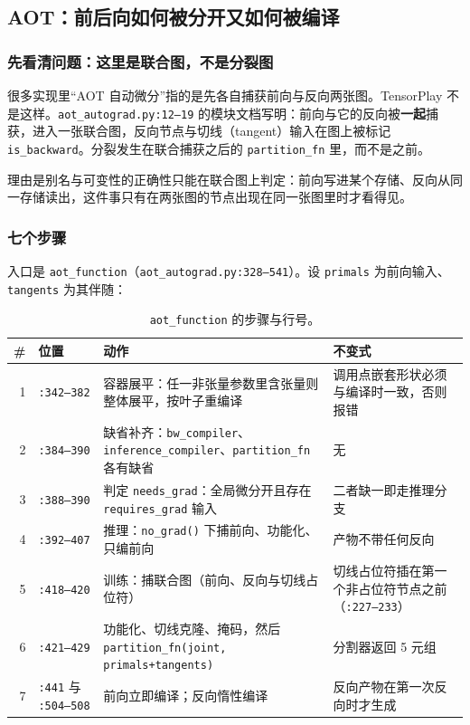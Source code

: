 \subsection{AOT：前后向如何被分开又如何被编译}

\subsubsection{先看清问题：这里是联合图，不是分裂图}

很多实现里“AOT 自动微分”指的是先各自捕获前向与反向两张图。TensorPlay 不是这样。\texttt{aot\_autograd.py:12--19} 的模块文档写明：前向与它的反向被\textbf{一起}捕获，进入一张联合图，反向节点与切线（tangent）输入在图上被标记 \texttt{is\_backward}。分裂发生在联合捕获之后的 \texttt{partition\_fn} 里，而不是之前。

理由是别名与可变性的正确性只能在联合图上判定：前向写进某个存储、反向从同一存储读出，这件事只有在两张图的节点出现在同一张图里时才看得见。

\subsubsection{七个步骤}

入口是 \texttt{aot\_function}（\texttt{aot\_autograd.py:328--541}）。设 \texttt{primals} 为前向输入、\texttt{tangents} 为其伴随：

\begin{table}[H]
\centering
\caption{\texttt{aot\_function} 的步骤与行号。}
\label{tab:fe:aotsteps}
\small
\begin{tabular}{rlll}
\toprule
\# & 位置 & 动作 & 不变式 \\
\midrule
1 & \texttt{:342--382} & 容器展平：任一非张量参数里含张量则整体展平，按叶子重编译 & 调用点嵌套形状必须与编译时一致，否则报错 \\
2 & \texttt{:384--390} & 缺省补齐：\texttt{bw\_compiler}、\texttt{inference\_compiler}、\texttt{partition\_fn} 各有缺省 & 无 \\
3 & \texttt{:388--390} & 判定 \texttt{needs\_grad}：全局微分开且存在 \texttt{requires\_grad} 输入 & 二者缺一即走推理分支 \\
4 & \texttt{:392--407} & 推理：\texttt{no\_grad()} 下捕前向、功能化、只编前向 & 产物不带任何反向 \\
5 & \texttt{:418--420} & 训练：捕联合图（前向、反向与切线占位符） & 切线占位符插在第一个非占位符节点之前（\texttt{:227--233}） \\
6 & \texttt{:421--429} & 功能化、切线克隆、掩码，然后 \texttt{partition\_fn(joint, primals+tangents)} & 分割器返回 5 元组 \\
7 & \texttt{:441} 与 \texttt{:504--508} & 前向立即编译；反向惰性编译 & 反向产物在第一次反向时才生成 \\
\bottomrule
\end{tabular}
\end{table}

